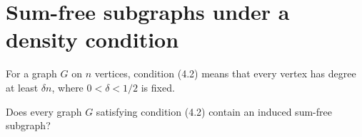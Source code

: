 \section{Sum-free subgraphs under a density condition}

For a graph $G$ on $n$ vertices, condition (4.2) means that every vertex has
degree at least $\delta n$, where $0 < \delta < 1/2$ is fixed.

\begin{question}
Does every graph $G$ satisfying condition (4.2) contain an induced sum-free
subgraph?
\end{question}
